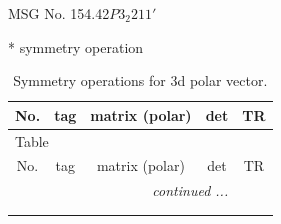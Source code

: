 \documentclass[fleqn,8pt]{jsarticle}
\begin{document}
\setcounter{MaxMatrixCols}{32}

\renewcommand{\tablename}{Table~}
\renewcommand{\figurename}{Figure~}
\begin{center}
\LARGE
MSG No. 154.42\quad$P3_{2}211'$
\end{center}
* symmetry operation
\renewcommand{\arraystretch}{1.3}
\begin{longtable}{ccccc}
\caption{Symmetry operations for 3d polar vector.}
 \\
 \hline \hline
No. & tag & matrix (polar) & det & TR \\ \hline \endfirsthead

\multicolumn{4}{l}{\tablename\ \thetable{}} \\
 \hline \hline
No. & tag & matrix (polar) & det & TR \\ \hline \endhead

 \hline \hline
\multicolumn{4}{r}{\footnotesize\it continued ...} \\ \endfoot

 \hline \hline
\multicolumn{4}{r}{} \\ \endlastfoot


\end{longtable}
\end{document}
